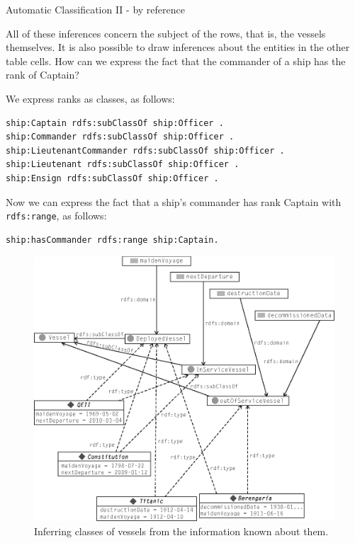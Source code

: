 \begin{challenge}{Automatic Classification II - by reference }

All of these inferences concern the subject of the rows, that is, the
vessels themselves. It is also possible to draw inferences about the
entities in the other table cells.
How can we express the fact that the commander of a ship has the rank of
Captain?

\solution

We express ranks as classes, as follows:

\begin{lstlisting}
ship:Captain rdfs:subClassOf ship:Officer .
ship:Commander rdfs:subClassOf ship:Officer .
ship:LieutenantCommander rdfs:subClassOf ship:Officer .
ship:Lieutenant rdfs:subClassOf ship:Officer .
ship:Ensign rdfs:subClassOf ship:Officer .
\end{lstlisting}

Now we can express the fact that a ship's commander has rank Captain
with \texttt{rdfs:range}, as follows:

\begin{lstlisting}
ship:hasCommander rdfs:range ship:Captain.
\end{lstlisting}

\begin{figure}
\centering
\includegraphics[width=5in]{media/ch8/f08-3.eps}
\caption{Inferring classes of vessels from the information known about them.}
\label{fig:ch8.3}
\end{figure}



\end{challenge}
